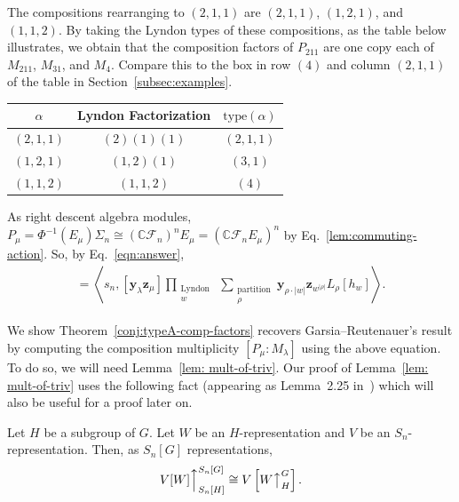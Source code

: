 \documentclass[ALCO, Unicode]{cedram}
\def\C{{\mathbb{C}}}
\def\type{\mathrm{type}}
\begin{document}
\begin{exam}
The compositions rearranging to $(2, 1, 1)$ are $(2, 1, 1)$, $(1, 2, 1)$, and $(1, 1, 2)$. By taking the Lyndon types of these compositions, as the table below illustrates, we obtain that the composition factors of $P_{211}$ are one copy each of $M_{211}$, $M_{31}$, and $M_{4}$. Compare this to the box in row $(4)$ and column $(2, 1, 1)$ of the table in Section~\ref{subsec:examples}.
\begin{table}[h]\label{table:excompmulttypea}
    \centering
    \begin{tabular}{c|c|c}
         $\alpha$ & Lyndon Factorization & $\type(\alpha)$  \\
         \hline
         $(2, 1, 1)$ & $(2)(1)(1)$ & $(2, 1, 1)$\\
         $(1,2, 1)$ & $(1,2)(1)$ & $(3, 1)$\\
          $( 1, 1, 2)$ & $(1,1,2)$ & $(4)$
    \end{tabular}
\end{table}
\end{exam}
As right descent algebra modules, $P_\mu = \Phi^{-1}(E_\mu)\Sigma_n \cong\left(\C \mathcal{F}_n\right)^{n} E_\mu = \left ( \C \mathcal{F}_n E_\mu \right)^n$ by Eq.~\eqref{lem:commuting-action}. So, by Eq.~\eqref{eqn:answer}, 
\begin{align*}
    [P_\mu: M_\lambda] =  \left \langle s_n, [\mathbf{y}_\lambda\mathbf{z}_\mu] \prod_{\substack{\text{Lyndon }\\ w}} \sum_{\substack{\text{partition}\\\rho}} \mathbf{y}_{\rho \cdot |w|}\mathbf{z}_{w^{|\rho|}}L_{\rho}[h_w] \right \rangle.
\end{align*}


We show  Theorem~\ref{conj:typeA-comp-factors} recovers Garsia--Reutenauer's result by computing the composition multiplicity $[P_\mu: M_\lambda]$ using the above equation. To do so, we will need Lemma~\ref{lem: mult-of-triv}. Our proof of Lemma~\ref{lem: mult-of-triv} uses the following fact (appearing as Lemma~2.25 in~\cite{Albach-Swanson}) which will also be useful for a proof later on. 

\begin{lemma}\label{conj:induction-wreath-prods}
Let $H$ be a subgroup of $G$. Let $W$ be an $H$-representation and $V$ be an $S_n$-representation. Then, as $S_n[G]$ representations,
\[V[W] \Big \uparrow_{S_n[H]}^{S_n[G]} \cong V\left[  W \big \uparrow_H^{G} \right].\]
\end{lemma}
\end{document}
